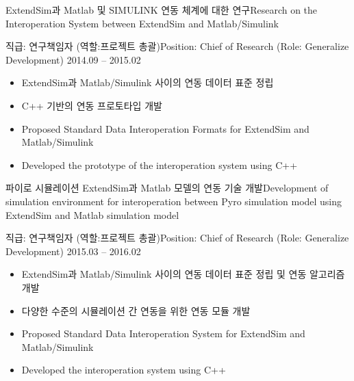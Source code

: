 \documentclass[english,representative]{resume_structure}
\begin{document}
\begin{Project}
{ExtendSim과 Matlab 및 SIMULINK 연동 체계에 대한 연구}{Research on the Interoperation System between ExtendSim and Matlab/Simulink}
{}{} 
{
\ResumeSubSection %
    {직급: 연구책임자 (역할:프로젝트 총괄)}{Position: Chief of Research (Role: Generalize Development)}
    {2014.09 -- 2015.02}
    {
      \begin{itemize}
        \item ExtendSim과 Matlab/Simulink 사이의 연동 데이터 표준 정립
        \item C++ 기반의 연동 프로토타입 개발
      \end{itemize}
    }
    {
      \begin{itemize}
        \item Proposed Standard Data Interoperation Formats for ExtendSim and Matlab/Simulink
        \item Developed the prototype of the interoperation system using C++
      \end{itemize}
    }
}

{파이로 시뮬레이션 ExtendSim과 Matlab 모델의 연동 기술 개발}{Development of simulation environment for interoperation between Pyro simulation model using ExtendSim and Matlab simulation model}
{}{} 
{
\ResumeSubSection %
    {직급: 연구책임자 (역할:프로젝트 총괄)}{Position: Chief of Research (Role: Generalize Development)}
    {2015.03 -- 2016.02}
    {
      \begin{itemize}
        \item ExtendSim과 Matlab/Simulink 사이의 연동 데이터 표준 정립 및 연동 알고리즘 개발
        \item 다양한 수준의 시뮬레이션 간 연동을 위한 연동 모듈 개발 
      \end{itemize}
    }
    {
      \begin{itemize}
        \item Proposed Standard Data Interoperation System for ExtendSim and Matlab/Simulink
        \item Developed the interoperation system using C++
      \end{itemize}
    }
}


\end{Project}
\end{document}
